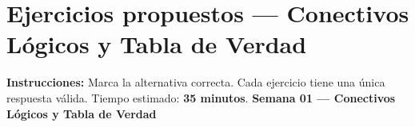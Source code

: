 	
	\newpage
	\section{Ejercicios propuestos — Conectivos Lógicos y Tabla de Verdad}
	
	\begin{tcolorbox}[
		enhanced, colback=GrisClaro, colframe=AzulPizarra,
		arc=2pt, boxrule=0.7pt, left=8pt, right=8pt, top=4pt, bottom=4pt
		]
		\small\sffamily
		\textbf{Instrucciones:} Marca la alternativa correcta. Cada ejercicio tiene
		una única respuesta válida. Tiempo estimado: \textbf{35 minutos}.
		\hfill \textbf{Semana 01 — Conectivos Lógicos y Tabla de Verdad}
	\end{tcolorbox}
	
	\vspace{0.4cm}
	
	\begin{tcolorbox}[
		enhanced, colback=VerdeSuave!40, colframe=VerdeOliva,
		arc=2pt, boxrule=0.5pt, fonttitle=\sffamily\bfseries\small,
		title={Nivel Básico}, left=4pt, right=4pt, top=3pt, bottom=3pt
		]
	\end{tcolorbox}
	
